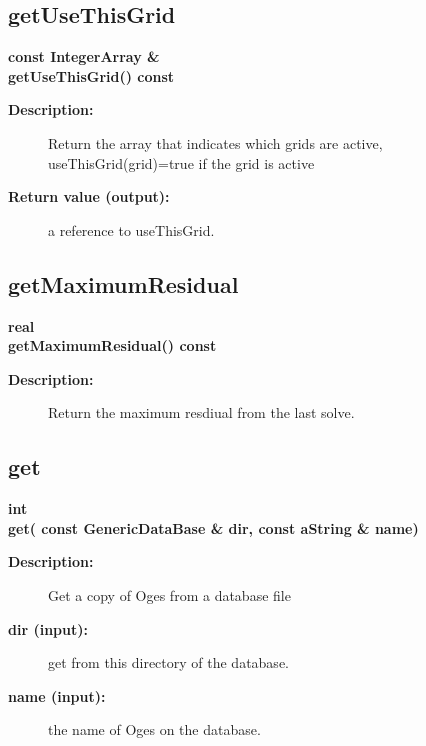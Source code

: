 \subsection{getUseThisGrid}
 
\begin{flushleft} \textbf{%
const IntegerArray \&  \\ 
\settowidth{\OgesIncludeArgIndent}{getUseThisGrid(}%
getUseThisGrid() const 
}\end{flushleft}
\begin{description}
\item[{\bf Description:}] 
   Return the array that indicates which grids are active, useThisGrid(grid)=true if the grid is active

\item[{\bf Return value (output):}]  a reference to useThisGrid.

\end{description}
\subsection{getMaximumResidual}
 
\begin{flushleft} \textbf{%
real  \\ 
\settowidth{\OgesIncludeArgIndent}{getMaximumResidual(}%
getMaximumResidual() const
}\end{flushleft}
\begin{description}
\item[{\bf Description:}] 
   Return the maximum resdiual from the last solve.
\end{description}
\subsection{get}
 
\begin{flushleft} \textbf{%
int  \\ 
\settowidth{\OgesIncludeArgIndent}{get(}%
get( const GenericDataBase \& dir, const aString \& name)
}\end{flushleft}
\begin{description}
\item[{\bf Description:}] 
   Get a copy of Oges from a database file
\item[{\bf dir (input):}]  get from this directory of the database.
\item[{\bf name (input):}]  the name of Oges on the database.
\end{description}
